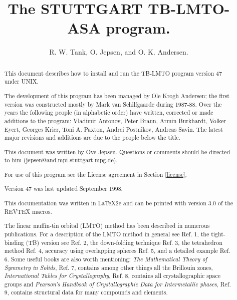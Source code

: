 \documentclass[aps,twocolumn,a4]{revtex4}
\begin{document}
\renewcommand{\thepage}{\roman{page}}
\title{The STUTTGART TB-LMTO-ASA program.}
\author{ R. W. Tank, O. Jepsen, and O. K. Andersen.}
\address{Max-Planck-Institut f\"ur
Festk\"orperforschung, Heisenbergstr. 1,\\D-70569 Stuttgart,
Federal Republic of Germany .}

\begin{abstract}
This document describes how to install and run the
TB-LMTO program version 47 under UNIX.

The development of this program has been managed by Ole Krogh Andersen;
the first version was constructed mostly by
Mark van Schilfgaarde during 1987-88.
Over the years the following people (in alphabetic order) have written,
corrected or made additions to the
program: Vladimir Antonov, Peter Braun,
Armin Burkhardt, Volker Eyert, Georges Krier,
Toni A. Paxton, Andrei Postnikov, Andreas Savin.
The latest major
revisions and additions are due to the people below the title.

This document was written by Ove Jepsen. Questions or comments
should be directed to him (jepsen@and.mpi-stuttgart.mpg.de).

For use of this program see the License
agreement in Section \ref{license}.

Version 47 was last updated September 1998.

This documentation was written in \LaTeX 2e and can be printed with
version 3.0 of the REVTEX macros.

The linear muffin-tin orbital (LMTO) method has been described in
numerous publications. For a description of the LMTO
method in general see Ref. 1, the tight-binding (TB)
version see Ref. 2, the down-folding technique Ref. 3,
the tetrahedron method Ref. 4, accuracy using overlapping spheres
Ref. 5, and a detailed example Ref. 6.
Some useful books are also worth mentioning:
{\it The Mathematical Theory of Symmetry in Solids}, Ref. 7,
contains among other things all the Brillouin zones, {\it
International Tables for Crystallography}, Ref. 8, contains all
crystallographic space groups and {\it Pearson's Handbook of
Crystallographic Data for Intermetallic phases}, Ref. 9, contains
structural
data for many compounds and elements.
\end{abstract}
\maketitle
\nopagebreak
\tableofcontents
\renewcommand{\thepage}{\arabic{page}}
\setcounter{page}{1}
%
\end{document}
